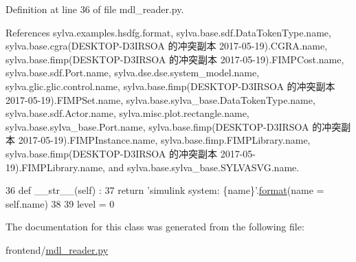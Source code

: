 Definition at line 36 of file mdl\+\_\+reader.\+py.



References sylva.\+examples.\+hsdfg.\+format, sylva.\+base.\+sdf.\+Data\+Token\+Type.\+name, sylva.\+base.\+cgra(\+D\+E\+S\+K\+T\+O\+P-\/\+D3\+I\+R\+S\+O\+A 的冲突副本 2017-\/05-\/19).\+C\+G\+R\+A.\+name, sylva.\+base.\+fimp(\+D\+E\+S\+K\+T\+O\+P-\/\+D3\+I\+R\+S\+O\+A 的冲突副本 2017-\/05-\/19).\+F\+I\+M\+P\+Cost.\+name, sylva.\+base.\+sdf.\+Port.\+name, sylva.\+dse.\+dse.\+system\+\_\+model.\+name, sylva.\+glic.\+glic.\+control.\+name, sylva.\+base.\+fimp(\+D\+E\+S\+K\+T\+O\+P-\/\+D3\+I\+R\+S\+O\+A 的冲突副本 2017-\/05-\/19).\+F\+I\+M\+P\+Set.\+name, sylva.\+base.\+sylva\+\_\+base.\+Data\+Token\+Type.\+name, sylva.\+base.\+sdf.\+Actor.\+name, sylva.\+misc.\+plot.\+rectangle.\+name, sylva.\+base.\+sylva\+\_\+base.\+Port.\+name, sylva.\+base.\+fimp(\+D\+E\+S\+K\+T\+O\+P-\/\+D3\+I\+R\+S\+O\+A 的冲突副本 2017-\/05-\/19).\+F\+I\+M\+P\+Instance.\+name, sylva.\+base.\+fimp.\+F\+I\+M\+P\+Library.\+name, sylva.\+base.\+fimp(\+D\+E\+S\+K\+T\+O\+P-\/\+D3\+I\+R\+S\+O\+A 的冲突副本 2017-\/05-\/19).\+F\+I\+M\+P\+Library.\+name, and sylva.\+base.\+sylva\+\_\+base.\+S\+Y\+L\+V\+A\+S\+V\+G.\+name.


\begin{DoxyCode}
36     \textcolor{keyword}{def }\_\_str\_\_(self) :
37       \textcolor{keywordflow}{return} \textcolor{stringliteral}{'simulink system: \{name\}'}.\hyperlink{namespacesylva_1_1examples_1_1hsdfg_ab3510a0b8457362330aa4d9fd2209590}{format}(name = self.name)
38 
39   level = 0
\end{DoxyCode}


The documentation for this class was generated from the following file\+:\begin{DoxyCompactItemize}
\item 
frontend/\hyperlink{mdl__reader_8py}{mdl\+\_\+reader.\+py}\end{DoxyCompactItemize}
